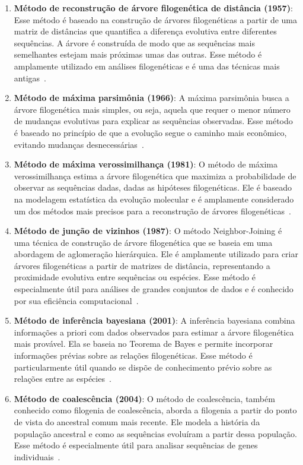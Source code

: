 \begin{enumerate}
  \item \textbf{Método de reconstrução de árvore filogenética de distância (1957)}: Esse método é baseado na construção de árvores filogenéticas a partir de uma matriz de distâncias que quantifica a diferença evolutiva entre diferentes sequências. A árvore é construída de modo que as sequências mais semelhantes estejam mais próximas umas das outras. Esse método é amplamente utilizado em análises filogenéticas e é uma das técnicas mais antigas~\cite{sokal_statistical_method_1958}.
  \item \textbf{Método de máxima parsimônia (1966)}: A máxima parsimônia busca a árvore filogenética mais simples, ou seja, aquela que requer o menor número de mudanças evolutivas para explicar as sequências observadas. Esse método é baseado no princípio de que a evolução segue o caminho mais econômico, evitando mudanças desnecessárias~\cite{fitch_toward_definition_1971}.
  \item \textbf{Método de máxima verossimilhança (1981)}: O método de máxima verossimilhança estima a árvore filogenética que maximiza a probabilidade de observar as sequências dadas, dadas as hipóteses filogenéticas. Ele é baseado na modelagem estatística da evolução molecular e é amplamente considerado um dos métodos mais precisos para a reconstrução de árvores filogenéticas~\cite{felsenstein_evolutionary_tree_1981}.
  \item \textbf{Método de junção de vizinhos (1987)}: O método Neighbor-Joining é uma técnica de construção de árvore filogenética que se baseia em uma abordagem de aglomeração hierárquica. Ele é amplamente utilizado para criar árvores filogenéticas a partir de matrizes de distância, representando a proximidade evolutiva entre sequências ou espécies. Esse método é especialmente útil para análises de grandes conjuntos de dados e é conhecido por sua eficiência computacional~\cite{saitou_neighbor_1987}. %
  \item \textbf{Método de inferência bayesiana (2001)}: A inferência bayesiana combina informações a priori com dados observados para estimar a árvore filogenética mais provável. Ela se baseia no Teorema de Bayes e permite incorporar informações prévias sobre as relações filogenéticas. Esse método é particularmente útil quando se dispõe de conhecimento prévio sobre as relações entre as espécies~\cite{huelsenbeck_bayesian_inference_2001}.
  \item \textbf{Método de coalescência (2004)}: O método de coalescência, também conhecido como filogenia de coalescência, aborda a filogenia a partir do ponto de vista do ancestral comum mais recente. Ele modela a história da população ancestral e como as sequências evoluíram a partir dessa população. Esse método é especialmente útil para analisar sequências de genes individuais~\cite{kingman_coalescent_1982}.

\end{enumerate}
